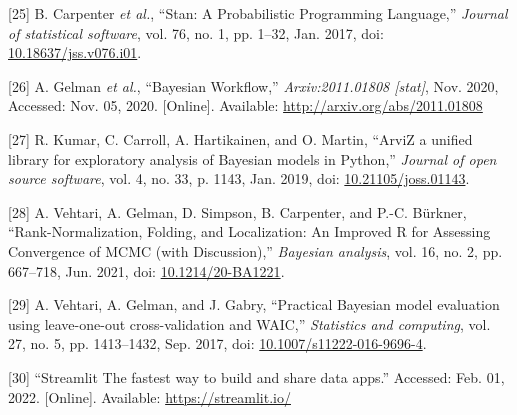 \documentclass[11pt]{article}
\begin{document}
\hypertarget{citeproc_bib_item_25}{[25] B. Carpenter \textit{et al.}, “Stan: A Probabilistic Programming Language,” \textit{Journal of statistical software}, vol. 76, no. 1, pp. 1–32, Jan. 2017, doi: \href{https://doi.org/10.18637/jss.v076.i01}{10.18637/jss.v076.i01}.}

\hypertarget{citeproc_bib_item_26}{[26] A. Gelman \textit{et al.}, “Bayesian Workflow,” \textit{Arxiv:2011.01808 [stat]}, Nov. 2020, Accessed: Nov. 05, 2020. [Online]. Available: \url{http://arxiv.org/abs/2011.01808}}

\hypertarget{citeproc_bib_item_27}{[27] R. Kumar, C. Carroll, A. Hartikainen, and O. Martin, “ArviZ a unified library for exploratory analysis of Bayesian models in Python,” \textit{Journal of open source software}, vol. 4, no. 33, p. 1143, Jan. 2019, doi: \href{https://doi.org/10.21105/joss.01143}{10.21105/joss.01143}.}

\hypertarget{citeproc_bib_item_28}{[28] A. Vehtari, A. Gelman, D. Simpson, B. Carpenter, and P.-C. Bürkner, “Rank-Normalization, Folding, and Localization: An Improved R for Assessing Convergence of MCMC (with Discussion),” \textit{Bayesian analysis}, vol. 16, no. 2, pp. 667–718, Jun. 2021, doi: \href{https://doi.org/10.1214/20-BA1221}{10.1214/20-BA1221}.}

\hypertarget{citeproc_bib_item_29}{[29] A. Vehtari, A. Gelman, and J. Gabry, “Practical Bayesian model evaluation using leave-one-out cross-validation and WAIC,” \textit{Statistics and computing}, vol. 27, no. 5, pp. 1413–1432, Sep. 2017, doi: \href{https://doi.org/10.1007/s11222-016-9696-4}{10.1007/s11222-016-9696-4}.}

\hypertarget{citeproc_bib_item_30}{[30] “Streamlit The fastest way to build and share data apps.” Accessed: Feb. 01, 2022. [Online]. Available: \url{https://streamlit.io/}}
\end{document}

